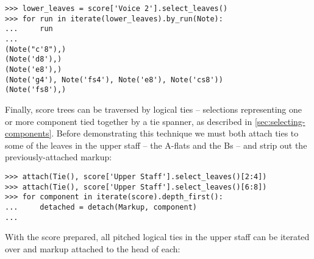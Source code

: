 \begin{comment}
<abjad>
lower_leaves = score['Voice 2'].select_leaves()
for run in iterate(lower_leaves).by_run(Note):
    run

</abjad>
\end{comment}

\begin{abjadbookoutput}
\begin{singlespacing}
\vspace{-0.5\baselineskip}
\begin{verbatim}
>>> lower_leaves = score['Voice 2'].select_leaves()
>>> for run in iterate(lower_leaves).by_run(Note):
...     run
...
(Note("c'8"),)
(Note('d8'),)
(Note('e8'),)
(Note('g4'), Note('fs4'), Note('e8'), Note('cs8'))
(Note('fs8'),)
\end{verbatim}
\end{singlespacing}
\end{abjadbookoutput}

\noindent Finally, score trees can be traversed by logical ties -- selections
representing one or more component tied together by a tie spanner, as described
in \autoref{sec:selecting-components}. Before demonstrating this technique we
must both attach ties to some of the leaves in the upper staff -- the A-flats
and the Bs -- and strip out the previously-attached markup:

\begin{comment}
<abjad>
attach(Tie(), score['Upper Staff'].select_leaves()[2:4])
attach(Tie(), score['Upper Staff'].select_leaves()[6:8])
for component in iterate(score).depth_first():
    detached = detach(Markup, component)

</abjad>
\end{comment}

\begin{abjadbookoutput}
\begin{singlespacing}
\vspace{-0.5\baselineskip}
\begin{verbatim}
>>> attach(Tie(), score['Upper Staff'].select_leaves()[2:4])
>>> attach(Tie(), score['Upper Staff'].select_leaves()[6:8])
>>> for component in iterate(score).depth_first():
...     detached = detach(Markup, component)
...
\end{verbatim}
\end{singlespacing}
\end{abjadbookoutput}

\noindent With the score prepared, all pitched logical ties in the upper staff
can be iterated over and markup attached to the head of each:

